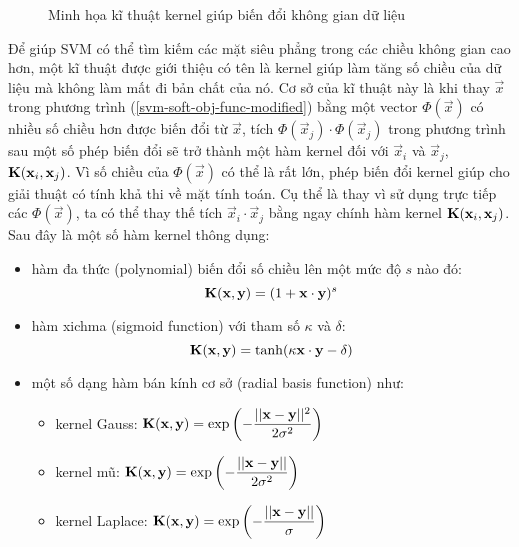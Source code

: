 \begin{figure}[ht]
\begin{subfigure}[b]{0.49\textwidth}
\end{subfigure}
\caption{Minh họa kĩ thuật kernel giúp biến đổi không gian dữ liệu\label{kernel-trick}}
\end{figure}

Để giúp SVM có thể tìm kiếm các mặt siêu phẳng trong các chiều không gian cao hơn, một kĩ thuật được giới thiệu có tên là kernel giúp làm tăng số chiều của dữ liệu mà không làm mất đi bản chất của nó. Cơ sở của kĩ thuật này là khi thay $\vec{x}$ trong phương trình (\ref{svm-soft-obj-func-modified}) bằng một vector $\Phi(\vec{x})$ có nhiều số chiều hơn được biến đổi từ $\vec{x}$, tích $\Phi(\vec{x}_j)\cdot\Phi(\vec{x}_j)$ trong phương trình sau một số phép biến đổi sẽ trở thành một hàm kernel đối với $\vec{x}_i$ và $\vec{x}_j$, $\operatorname{\mathbf{K}}(\mathbf{x}_i,\mathbf{x}_j)$. Vì số chiều của $\Phi(\vec{x})$ có thể là rất lớn, phép biến đổi kernel giúp cho giải thuật có tính khả thi về mặt tính toán. Cụ thể là thay vì sử dụng trực tiếp các $\Phi(\vec{x})$, ta có thể thay thế tích $\vec{x}_i\cdot\vec{x}_j$ bằng ngay chính hàm kernel $\operatorname{\mathbf{K}}(\mathbf{x}_i,\mathbf{x}_j)$. Sau đây là một số hàm kernel thông dụng:

\begin{itemize}
\item hàm đa thức (polynomial) biến đổi số chiều lên một mức độ $s$ nào đó:
\[\operatorname{\mathbf{K}}(\mathbf{x},\mathbf{y})=(1+\mathbf{x}\cdot\mathbf{y})^s\]
\item hàm xichma (sigmoid function) với tham số $\kappa$ và $\delta$:
\[\operatorname{\mathbf{K}}(\mathbf{x},\mathbf{y})=\tanh(\kappa \mathbf{x}\cdot \mathbf{y}-\delta)\]
\item một số dạng hàm bán kính cơ sở (radial basis function) như:
\begin{itemize}
\item kernel Gauss: $\operatorname{\mathbf{K}}(\mathbf{x},\mathbf{y})=\exp\left(-\dfrac{||\mathbf{x}-\mathbf{y}||^2}{2\sigma^2}\right)$
\item kernel mũ: $\operatorname{\mathbf{K}}(\mathbf{x},\mathbf{y})=\exp\left(-\dfrac{||\mathbf{x}-\mathbf{y}||}{2\sigma^2}\right)$
\item kernel Laplace: $\operatorname{\mathbf{K}}(\mathbf{x},\mathbf{y})=\exp\left(-\dfrac{||\mathbf{x}-\mathbf{y}||}{\sigma}\right)$
\end{itemize}
\end{itemize}


